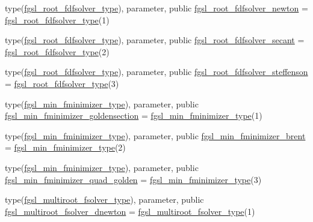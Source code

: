 \begin{DoxyCompactItemize}
\item 
type(\hyperlink{structfgsl_1_1fgsl__root__fdfsolver__type}{fgsl\+\_\+root\+\_\+fdfsolver\+\_\+type}), parameter, public \hyperlink{namespacefgsl_aa05053ddddf728c909cfa5bed48b65dc}{fgsl\+\_\+root\+\_\+fdfsolver\+\_\+newton} = \hyperlink{structfgsl_1_1fgsl__root__fdfsolver__type}{fgsl\+\_\+root\+\_\+fdfsolver\+\_\+type}(1)
\item 
type(\hyperlink{structfgsl_1_1fgsl__root__fdfsolver__type}{fgsl\+\_\+root\+\_\+fdfsolver\+\_\+type}), parameter, public \hyperlink{namespacefgsl_a52cb2fcd33e5ad5b7bf7303a8b47764a}{fgsl\+\_\+root\+\_\+fdfsolver\+\_\+secant} = \hyperlink{structfgsl_1_1fgsl__root__fdfsolver__type}{fgsl\+\_\+root\+\_\+fdfsolver\+\_\+type}(2)
\item 
type(\hyperlink{structfgsl_1_1fgsl__root__fdfsolver__type}{fgsl\+\_\+root\+\_\+fdfsolver\+\_\+type}), parameter, public \hyperlink{namespacefgsl_aca4a5d84619cc9678ec442a1f33741aa}{fgsl\+\_\+root\+\_\+fdfsolver\+\_\+steffenson} = \hyperlink{structfgsl_1_1fgsl__root__fdfsolver__type}{fgsl\+\_\+root\+\_\+fdfsolver\+\_\+type}(3)
\item 
type(\hyperlink{structfgsl_1_1fgsl__min__fminimizer__type}{fgsl\+\_\+min\+\_\+fminimizer\+\_\+type}), parameter, public \hyperlink{namespacefgsl_a372d8c5ea330e874febcdaf090c8f8fc}{fgsl\+\_\+min\+\_\+fminimizer\+\_\+goldensection} = \hyperlink{structfgsl_1_1fgsl__min__fminimizer__type}{fgsl\+\_\+min\+\_\+fminimizer\+\_\+type}(1)
\item 
type(\hyperlink{structfgsl_1_1fgsl__min__fminimizer__type}{fgsl\+\_\+min\+\_\+fminimizer\+\_\+type}), parameter, public \hyperlink{namespacefgsl_a0434a8f5d054ed9038714a856f8937ad}{fgsl\+\_\+min\+\_\+fminimizer\+\_\+brent} = \hyperlink{structfgsl_1_1fgsl__min__fminimizer__type}{fgsl\+\_\+min\+\_\+fminimizer\+\_\+type}(2)
\item 
type(\hyperlink{structfgsl_1_1fgsl__min__fminimizer__type}{fgsl\+\_\+min\+\_\+fminimizer\+\_\+type}), parameter, public \hyperlink{namespacefgsl_a7c479328d8e7e7d55f2fa4908d0122c9}{fgsl\+\_\+min\+\_\+fminimizer\+\_\+quad\+\_\+golden} = \hyperlink{structfgsl_1_1fgsl__min__fminimizer__type}{fgsl\+\_\+min\+\_\+fminimizer\+\_\+type}(3)
\item 
type(\hyperlink{structfgsl_1_1fgsl__multiroot__fsolver__type}{fgsl\+\_\+multiroot\+\_\+fsolver\+\_\+type}), parameter, public \hyperlink{namespacefgsl_a1621295c3bf584aab577fe54f3a89fb0}{fgsl\+\_\+multiroot\+\_\+fsolver\+\_\+dnewton} = \hyperlink{structfgsl_1_1fgsl__multiroot__fsolver__type}{fgsl\+\_\+multiroot\+\_\+fsolver\+\_\+type}(1)

\end{DoxyCompactItemize}
